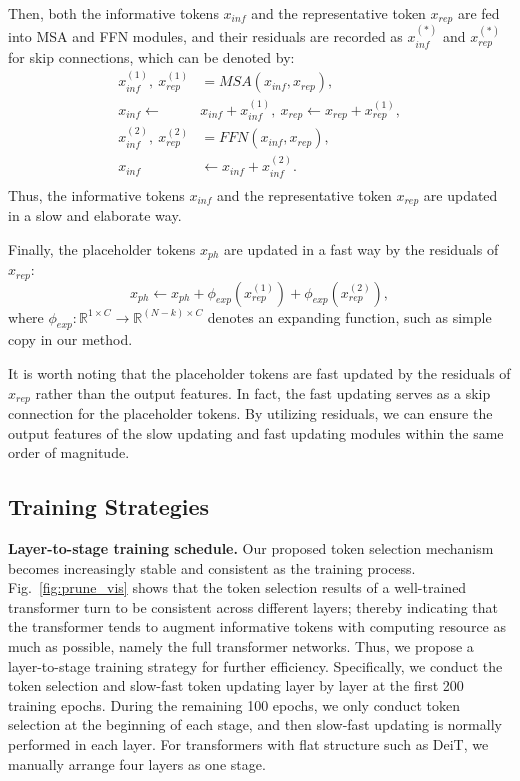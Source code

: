 \documentclass[letterpaper]{article} \usepackage{aaai22}  \usepackage{times}  \usepackage{helvet}  \usepackage{courier}  \usepackage[hyphens]{url}  \usepackage{graphicx} \urlstyle{rm} \def\UrlFont{\rm}  \usepackage{natbib}  \usepackage{caption} \DeclareCaptionStyle{ruled}{labelfont=normalfont,labelsep=colon,strut=off} \frenchspacing  \setlength{\pdfpagewidth}{8.5in}  \setlength{\pdfpageheight}{11in}  \usepackage{algorithm}
\begin{document}
Then, both the informative tokens $x_{inf}$ and the representative token $x_{rep}$ are fed into MSA and FFN modules, and their residuals are recorded as $x_{inf}^{(*)}$ and $x_{rep}^{(*)}$ for skip connections, which can be denoted by:
\begin{equation}
    \begin{split}
        x_{inf}^{(1)}, \ x_{rep}^{(1)} & = MSA(x_{inf},x_{rep}),\\
        x_{inf} \gets & x_{inf} + x_{inf}^{(1)}, \
        x_{rep} \gets x_{rep} + x_{rep}^{(1)},\\
        x_{inf}^{(2)}, \ x_{rep}^{(2)} & = FFN(x_{inf},x_{rep}),\\
        x_{inf} & \gets x_{inf} + x_{inf}^{(2)}.\\
    \end{split}
\end{equation}
Thus, the informative tokens $x_{inf}$ and the representative token $x_{rep}$ are updated in a slow and elaborate way.

Finally, the placeholder tokens $x_{ph}$ are updated in a fast way by the residuals of $x_{rep}$:
\begin{equation}
    x_{ph} \gets x_{ph} + \phi_{exp}(x_{rep}^{(1)}) + \phi_{exp}(x_{rep}^{(2)}),
\end{equation}
where $\phi_{exp}: \mathbb{R}^{1 \times C} \rightarrow \mathbb{R}^{(N-k) \times C}$ denotes an expanding function, such as simple copy in our method. 

It is worth noting that the placeholder tokens are fast updated by the residuals of $x_{rep}$ rather than the output features. In fact, the fast updating serves as a skip connection for the placeholder tokens.
By utilizing residuals, we can ensure the output features of the slow updating and fast updating modules within the same order of magnitude. 



\subsection{Training Strategies}




\noindent\textbf{Layer-to-stage training schedule.} 
Our proposed token selection mechanism becomes increasingly stable and consistent as the training process. Fig.~\ref{fig:prune_vis} shows that the token selection results of a well-trained transformer turn to be consistent across different layers;  thereby indicating that the transformer tends to augment informative tokens with computing resource as much as possible, namely the full transformer networks.
Thus, we propose a layer-to-stage training strategy for further efficiency. Specifically, we conduct the token selection and slow-fast token updating layer by layer at the first 200 training epochs. During the remaining 100 epochs, we only conduct token selection at the beginning of each stage, and then slow-fast updating is normally performed in each layer. For transformers with flat structure such as DeiT, we manually arrange four layers as one stage. 
\end{document}
